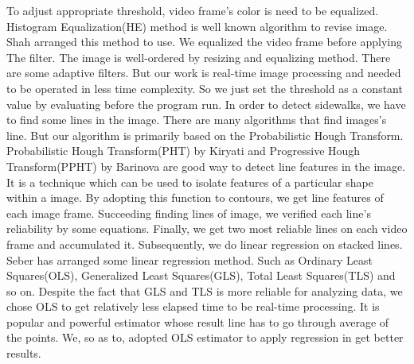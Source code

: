 To adjust appropriate threshold, video frame's color is need to be equalized. Histogram Equalization(HE) method is well known algorithm to revise image. Shah \cite[A REVIEW ON IMAGE CONTRAST ENHANCEMENT TECHNIQUES USING HISTOGRAM EQUALIZATION]{shah2015review} arranged this method to use. We equalized the video frame before applying The filter. The image is well-ordered by resizing and equalizing method. There are some adaptive filters. But our work is real-time image processing and needed to be operated in less time complexity. So we just set the threshold as a constant value by evaluating before the program run. \newline
In order to detect sidewalks, we have to find some lines in the image. There are many algorithms that find images's line. But our algorithm is primarily based on the Probabilistic Hough Transform. Probabilistic Hough Transform(PHT) by Kiryati\cite[A probabilistic Hough transform]{kiryati1991probabilistic} and Progressive Hough Transform(PPHT) by Barinova \cite[On detection of multiple object instances using hough transforms]{barinova2012detection} are good way to detect line features in the image. It is a technique which can be used to isolate features of a particular shape within a image. By adopting this function to contours, we get line features of each image frame. 
Succeeding finding lines of image, we verified each line's reliability by some equations. \newline
Finally, we get two most reliable lines on each video frame and accumulated it. Subsequently, we do linear regression on stacked lines. Seber\cite[Linear Regression Analysis]{seber2012linear} has arranged some linear regression method. Such as Ordinary Least Squares(OLS), Generalized Least Squares(GLS), Total Least Squares(TLS) and so on. Despite the fact that GLS and TLS is more reliable for analyzing data, we chose OLS to get relatively less elapsed time to be real-time processing. It is popular and powerful estimator whose result line has to go through average of the points. We, so as to, adopted OLS estimator to apply regression in get better results.